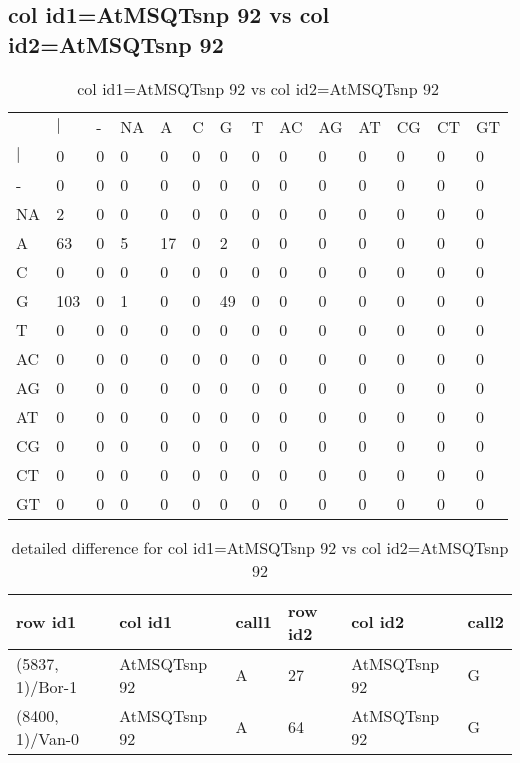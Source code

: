 \subsection{col id1=AtMSQTsnp 92 vs col id2=AtMSQTsnp 92}
\begin{center}
\begin{longtable}{|l|l|l|l|l|l|l|l|l|l|l|l|l|l|}
\caption{col id1=AtMSQTsnp 92 vs col id2=AtMSQTsnp 92} \label{table_dm780}\\
\hline
\\
\hline
&$|$&-&NA&A&C&G&T&AC&AG&AT&CG&CT&GT\\
$|$&0&0&0&0&0&0&0&0&0&0&0&0&0\\
-&0&0&0&0&0&0&0&0&0&0&0&0&0\\
NA&2&0&0&0&0&0&0&0&0&0&0&0&0\\
A&63&0&5&17&0&2&0&0&0&0&0&0&0\\
C&0&0&0&0&0&0&0&0&0&0&0&0&0\\
G&103&0&1&0&0&49&0&0&0&0&0&0&0\\
T&0&0&0&0&0&0&0&0&0&0&0&0&0\\
AC&0&0&0&0&0&0&0&0&0&0&0&0&0\\
AG&0&0&0&0&0&0&0&0&0&0&0&0&0\\
AT&0&0&0&0&0&0&0&0&0&0&0&0&0\\
CG&0&0&0&0&0&0&0&0&0&0&0&0&0\\
CT&0&0&0&0&0&0&0&0&0&0&0&0&0\\
GT&0&0&0&0&0&0&0&0&0&0&0&0&0\\
\hline
\end{longtable}
\end{center}

\begin{center}
\begin{longtable}{|l|l|l|l|l|l|}
\caption{detailed difference for col id1=AtMSQTsnp 92 vs col id2=AtMSQTsnp 92} \label{table_dm781}\\
\hline
row id1&col id1&call1&row id2&col id2&call2\\
\hline
(5837, 1)/Bor-1&AtMSQTsnp 92&A&27&AtMSQTsnp 92&G\\
(8400, 1)/Van-0&AtMSQTsnp 92&A&64&AtMSQTsnp 92&G\\
\hline
\end{longtable}
\end{center}

